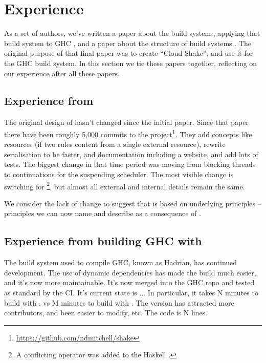 \section{Experience}\label{sec-experience}

As a set of authors, we've written a paper about the \Shake build system \cite{mitchell2012shake},
applying that build system to GHC \cite{hadrian}, and a paper about the structure of build
systems \cite{mokhov2018buildsystems}. The original purpose of that final paper was to create
``Cloud Shake'', and use it for the GHC build system. In this section we tie these papers together,
reflecting on our experience after all these papers.

\subsection{Experience from \Shake}

The original design of \Shake hasn't changed since the initial paper. Since that paper there have been roughly 5,000 commits to the \Shake project\footnote{\url{https://github.com/ndmitchell/shake}}. They add concepts like resources (if two rules content from a single external resource), rewrite serialisation to be faster, and documentation including a website, and add lots of tests. The biggest change in that time period was moving from blocking threads to continuations for the suspending scheduler. The most visible change is switching \hs{*>} for \hs{\%>}\footnote{A conflicting \hs{*>} operator was added to the Haskell .}, but almost all external and internal details remain the same.

We consider the lack of change to suggest that \Shake is based on underlying principles -- principles we can now name and describe as a consequence of \cite{mokhov2018buildsystems}.

\subsection{Experience from building GHC with \Shake}


The build system used to compile GHC, known as Hadrian, has continued development. The use of dynamic dependencies has made the build much easier, and it's now more maintainable. It's now merged into the GHC repo and tested as standard by the CI. It's current state is ... In particular, it takes N minutes to build with \Shake, vs M minutes to build with \Make. The \Shake version has attracted more contributors, and been easier to modify, etc. The code is N lines.

